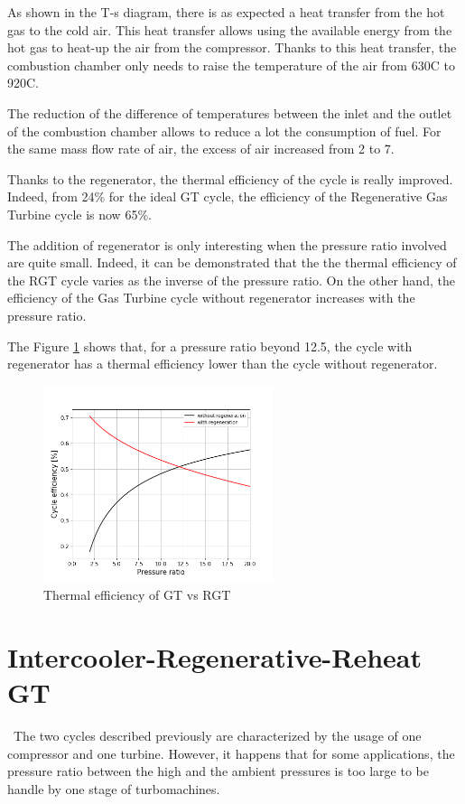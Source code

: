As shown in the T-s diagram, there is as expected a heat transfer from the hot gas to the cold air. This heat transfer allows using the available energy from the hot gas to heat-up the air from the compressor. Thanks to this heat transfer, the combustion chamber only needs to raise the temperature of the air from 630\degree C to 920\degree C. 

The reduction of the difference of temperatures between the inlet and the outlet of the combustion chamber allows to reduce a lot the consumption of fuel. For the same mass flow rate of air, the excess of air increased from 2 to 7.   

Thanks to the regenerator, the thermal efficiency of the cycle is really improved. Indeed, from 24\% for the ideal GT cycle, the efficiency of the Regenerative Gas Turbine cycle is now 65\%.

The addition of regenerator is only interesting when the pressure ratio involved are quite small. Indeed, it can be demonstrated that the the thermal efficiency of the RGT cycle varies as the inverse of the pressure ratio. On the other hand, the efficiency of the Gas Turbine cycle without regenerator increases with the pressure ratio. 

The Figure \ref{fig:C5_eff_RGT-GT} shows that, for a pressure ratio beyond 12.5, the cycle with regenerator has a thermal efficiency lower than the cycle without regenerator. 

\begin{figure}[h]
    \centering
    \includegraphics[width=0.6\textwidth]{Chapitre_5/Images/Efficiency_ideal_Brayton_regen.png}
    \caption{Thermal efficiency of GT vs RGT}
    \label{fig:C5_eff_RGT-GT}
\end{figure}

\section{Intercooler-Regenerative-Reheat GT}
\quad\ The two cycles described previously are characterized by the usage of one compressor and one turbine. However, it happens that for some applications, the pressure ratio between the high and the ambient pressures is too large to be handle by one stage of turbomachines.

